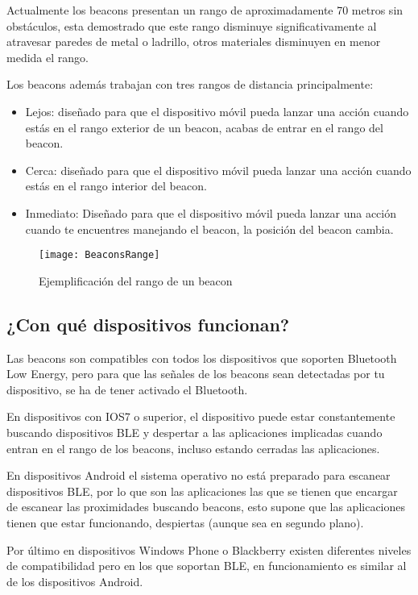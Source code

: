 Actualmente los beacons presentan un rango de aproximadamente 70 metros sin obstáculos, esta demostrado que este rango disminuye significativamente al atravesar paredes de metal o ladrillo, otros materiales disminuyen en menor medida el rango. 

Los beacons además trabajan con tres rangos de distancia principalmente: 

\begin{itemize}
\item Lejos: diseñado para que el dispositivo móvil pueda lanzar una acción cuando estás en el rango exterior de un beacon, acabas de entrar en el rango del beacon.
\item Cerca: diseñado para que el dispositivo móvil pueda lanzar una acción cuando estás en el rango interior del beacon. 
\item Inmediato: Diseñado para que el dispositivo móvil pueda lanzar una acción cuando te encuentres manejando el beacon, la posición del beacon cambia.
\end{itemize}

\begin{figure}[h]
	\centering
	\texttt{[image: BeaconsRange]}
	\caption{Ejemplificación del rango de un beacon}
	\label{fig:beaconRange}
\end{figure}

\subsection{¿Con qué dispositivos funcionan?}

Las beacons son compatibles con todos los dispositivos que soporten Bluetooth Low Energy, pero para que las señales de los beacons sean detectadas por tu dispositivo, se ha de tener activado el Bluetooth. 


En dispositivos con IOS7 \cite{URL::IOS7} o superior, el dispositivo puede estar constantemente buscando dispositivos BLE y despertar a las aplicaciones implicadas cuando entran en el rango de los beacons, incluso estando cerradas las aplicaciones.


En dispositivos Android \cite{URL::Android} el sistema operativo no está preparado para escanear dispositivos BLE, por lo que son las aplicaciones las que se tienen que encargar de escanear las proximidades buscando beacons, esto supone que las aplicaciones tienen que estar funcionando, despiertas (aunque sea en segundo plano).

Por último en dispositivos Windows Phone \cite{URL:WindowsPhone} o Blackberry \cite{URL:Blackberry} existen diferentes niveles de compatibilidad pero en los que soportan BLE, en funcionamiento es similar al de los dispositivos Android. 


